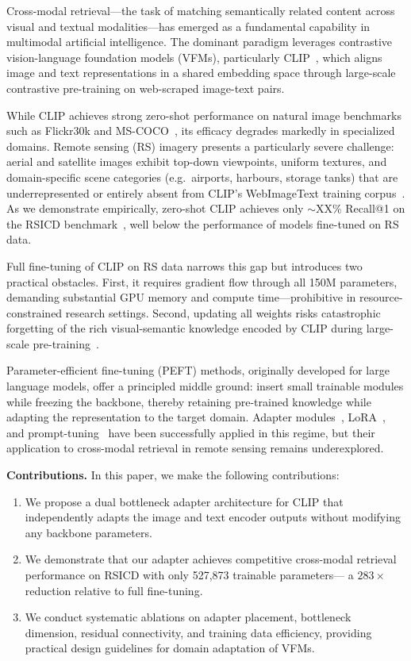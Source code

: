 \documentclass[review,12pt]{elsarticle}
\begin{document}
Cross-modal retrieval---the task of matching semantically related content
across visual and textual modalities---has emerged as a fundamental capability
in multimodal artificial intelligence. The dominant paradigm leverages
contrastive vision-language foundation models (VFMs), particularly
CLIP~\cite{radford2021clip}, which aligns image and text representations in a
shared embedding space through large-scale contrastive pre-training on
web-scraped image-text pairs.

While CLIP achieves strong zero-shot performance on natural image benchmarks
such as Flickr30k and MS-COCO~\cite{young2014flickr,lin2014coco}, its
efficacy degrades markedly in specialized domains. Remote sensing (RS)
imagery presents a particularly severe challenge: aerial and satellite images
exhibit top-down viewpoints, uniform textures, and domain-specific scene
categories (e.g.\ airports, harbours, storage tanks) that are underrepresented
or entirely absent from CLIP's WebImageText training corpus~\cite{radford2021clip}.
As we demonstrate empirically, zero-shot CLIP achieves only $\sim$XX\% Recall@1
on the RSICD benchmark~\cite{lu2017exploring}, well below the performance of
models fine-tuned on RS data.

Full fine-tuning of CLIP on RS data narrows this gap but introduces two
practical obstacles. First, it requires gradient flow through all 150M
parameters, demanding substantial GPU memory and compute time---prohibitive in
resource-constrained research settings. Second, updating all weights risks
catastrophic forgetting of the rich visual-semantic knowledge encoded by CLIP
during large-scale pre-training~\cite{kirkpatrick2017ewc}.

Parameter-efficient fine-tuning (PEFT) methods, originally developed for
large language models, offer a principled middle ground: insert small trainable
modules while freezing the backbone, thereby retaining pre-trained knowledge
while adapting the representation to the target domain. Adapter
modules~\cite{houlsby2019adapters}, LoRA~\cite{hu2022lora}, and
prompt-tuning~\cite{zhou2022coop} have been successfully applied in this
regime, but their application to cross-modal retrieval in remote sensing
remains underexplored.

\textbf{Contributions.} In this paper, we make the following contributions:
\begin{enumerate}
    \item We propose a dual bottleneck adapter architecture for CLIP that
          independently adapts the image and text encoder outputs without
          modifying any backbone parameters.
    \item We demonstrate that our adapter achieves competitive cross-modal
          retrieval performance on RSICD with only 527,873 trainable parameters---
          a $283\times$ reduction relative to full fine-tuning.
    \item We conduct systematic ablations on adapter placement, bottleneck
          dimension, residual connectivity, and training data efficiency,
          providing practical design guidelines for domain adaptation of VFMs.
\end{enumerate}
\end{document}
